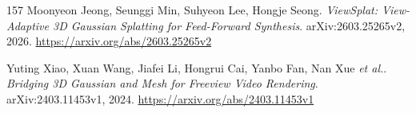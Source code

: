 \documentclass[11pt,a4paper]{article}
\begin{document}
\begin{thebibliography}{157}
Moonyeon Jeong, Seunggi Min, Suhyeon Lee, Hongje Seong.
\newblock \emph{ViewSplat: View-Adaptive 3D Gaussian Splatting for Feed-Forward Synthesis}.
\newblock arXiv:2603.25265v2, 2026.
\newblock \url{https://arxiv.org/abs/2603.25265v2}

Yuting Xiao, Xuan Wang, Jiafei Li, Hongrui Cai, Yanbo Fan, Nan Xue \emph{et al.}.
\newblock \emph{Bridging 3D Gaussian and Mesh for Freeview Video Rendering}.
\newblock arXiv:2403.11453v1, 2024.
\newblock \url{https://arxiv.org/abs/2403.11453v1}

\end{thebibliography}
\end{document}
